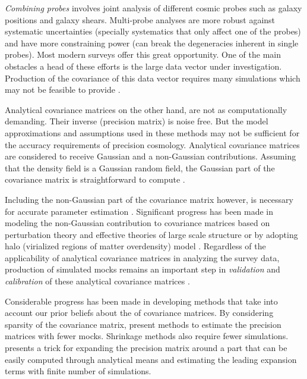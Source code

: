 \emph{Combining probes} involves joint analysis of different cosmic probes such as galaxy 
positions and galaxy shears. Multi-probe analyses are more robust against systematic 
uncertainties (specially systematics that only affect one of the probes) 
and have more constraining power (can break the degeneracies inherent in single probes). 
Most modern surveys offer this great opportunity. 
One of the main obstacles a head of these efforts is the large data vector under investigation. 
Production of the covariance of this data vector requires many simulations which may not 
be feasible to provide \citep{eifler2015,schaan,krause2016,kwan2017}.   

Analytical covariance matrices on the other hand, are not as computationally demanding. 
Their inverse (precision matrix) is noise free. But the model approximations and assumptions used in these methods may not be sufficient for the accuracy requirements of precision cosmology. Analytical covariance matrices are considered to receive Gaussian and a non-Gaussian contributions. Assuming that the density field is a 
Gaussian random field, the Gaussian part of the covariance matrix is straightforward to compute \citep{grieb2016,klaus2016,slepian2016b}.

Including the non-Gaussian part of the covariance matrix however, is necessary for accurate parameter estimation \citep{takahashi2011,blot2016,chan2016}.
Significant progress has been made in modeling the non-Gaussian contribution to covariance matrices based on perturbation theory and effective theories of large scale structure \citep{mohammed_seljak,mohammed2017} or by adopting halo (virialized regions of matter overdensity) model \citep{takada_spergel,eifler2014}.
Regardless of the applicability of analytical covariance matrices in analyzing the survey data, production of simulated mocks remains an important step in \emph{validation} and \emph{calibration} of these analytical covariance matrices \citep{slepian2016b,hildebrandt2017}.

Considerable progress has been made in developing methods that take into account our prior beliefs 
about the of covariance matrices. By considering sparsity of the covariance matrix, \citet{paz2015,padmanabhan2016} 
present methods to estimate the precision matrices with fewer mocks. Shrinkage methods \citep{pope2008,joachimi2016} 
also require fewer simulations. \citet{fried2017} presents a trick for expanding the precision matrix 
around a part that can be easily computed through analytical means and estimating the leading expansion terms with finite number of simulations.

